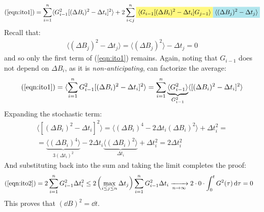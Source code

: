 \documentclass[../template.tex]{subfiles}
\begin{document}
\begin{example}[Integral in $\dd{B}^2$]
    \begin{align*}
        (\ref{eqn:ito1})
        = \sum_{i=1}^{n} \langle G_{i-1}^2 [(\Delta B_i)^2 - \Delta t_i]^2 \rangle + 2 \sum_{i<j}^n \hlc{Yellow}{\langle G_{i-1}[(\Delta B_i)^2 - \Delta t_i] G_{j-1} \rangle} \hlc{SkyBlue}{\langle (\Delta B_j)^2 - \Delta t_j \rangle}
    \end{align*} 
    Recall that:
    \begin{align*}
        \langle (\Delta B_j)^2 - \Delta t_j \rangle = \langle (\Delta B_j)^2 \rangle - \Delta t_j = 0
    \end{align*}
    and so only the first term of (\ref{eqn:ito1}) remains. Again, noting that $G_{i-1}$ does not depend on $\Delta B_i$, as it is \textit{non-anticipating}, can factorize the average: 
    \begin{align}
        (\ref{eqn:ito1}) = \langle \sum_{i=1}^n G_{i-1}^2 [(\Delta B_i)^2 - \Delta t_i]^2 \rangle = \sum_{i=1}^n \underbrace{\langle G_{i-1}^2 \rangle}_{G_{i-1}^2} \langle [(\Delta B_i)^2 - \Delta t_i]^2 \rangle
        \label{eqn:ito2}
    \end{align}
    Expanding the stochastic term:
    \begin{align*}
        \langle [(\Delta B_i)^2 - \Delta t_i]^2 \rangle = \langle  (\Delta B_i)^4 - 2 \Delta t_i (\Delta B_i)^2 \rangle + \Delta t_i^2 = \\
        = \underbrace{\langle (\Delta B_i)^4 \rangle}_{3(\Delta t_i)^2}  - 2 \Delta t_i \underbrace{\langle (\Delta B_i)^2 \rangle}_{\Delta t_i}  + \Delta t_i^2 = 2 \Delta t_i^2 
    \end{align*}
    And substituting back into the sum and taking the limit completes the proof:
    \begin{align*}
        (\ref{eqn:ito2}) 
        &= 2 \sum_{i=1}^n G_{i-1}^2 \Delta t_i^2 \leq 2 \left(\max_{i\leq j \leq n} \Delta t_j\right) \sum_{i=1}^n G_{i-1}^2 \Delta t_i  \xrightarrow[n \to \infty]{}  2 \cdot 0 \cdot \int_0^t G^2(\tau) \dd{\tau} = 0
    \end{align*}
    This proves that $(\dd{B})^2 = \dd{t}$. 
\end{example}
\end{document}
